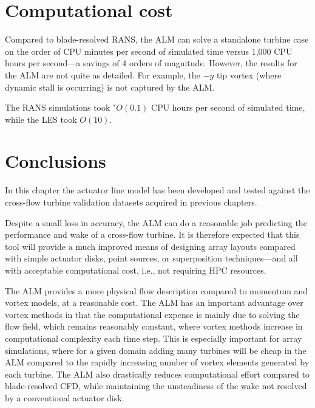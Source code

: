 

\section{Computational cost}


Compared to blade-resolved RANS, the ALM can solve a standalone turbine case on
the order of CPU minutes per second of simulated time versus 1,000 CPU hours per
second---a savings of 4 orders of magnitude. However, the results for the ALM
are not quite as detailed. For example, the $-y$ tip vortex (where dynamic stall
is occurring) is not captured by the ALM.

The RANS simulations took "$O(0.1)$ CPU hours per second of simulated time,
while the LES took $O(10)$.


\section{Conclusions}

In this chapter the actuator line model has been developed and tested against
the cross-flow turbine validation datasets acquired in previous chapters.

Despite a small loss in accuracy, the ALM can do a reasonable job predicting the
performance and wake of a cross-flow turbine. It is therefore expected that this
tool will provide a much improved means of designing array layouts compared with
simple actuator disks, point sources, or superposition techniques---and all with
acceptable computational cost, i.e., not requiring HPC resources.

The ALM provides a more physical flow description compared to momentum and
vortex models, at a reasonable cost. The ALM has an important advantage over
vortex methods in that the computational expense is mainly due to solving the
flow field, which remains reasonably constant, where vortex methods increase in
computational complexity each time step. This is especially important for array
simulations, where for a given domain adding many turbines will be cheap in the
ALM compared to the rapidly increasing number of vortex elements generated by
each turbine. The ALM also drastically reduces computational effort compared to
blade-resolved CFD, while maintaining the unsteadiness of the wake not resolved
by a conventional actuator disk.

